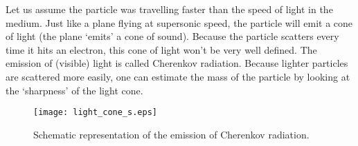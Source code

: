 Let us assume the particle was travelling faster than the speed of light in the medium. Just like a plane flying at supersonic speed, the particle will emit a cone of light (the plane `emits' a cone of sound). Because the particle scatters every time it hits an electron, this cone of light won't be very well defined. The emission of (visible) light is called Cherenkov radiation. Because lighter particles are scattered more easily, one can estimate the mass of the particle by looking at the `sharpness' of the light cone.

\begin{figure}\begin{center}
\texttt{[image: light\_cone\_s.eps]}%
\caption{Schematic representation of the emission of Cherenkov radiation.}\label{fig:light_cone}
\end{center}\end{figure}

